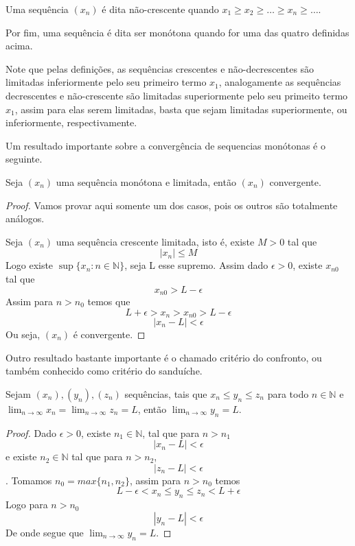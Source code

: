 Uma sequência $(x_n)$ é dita não-crescente quando $x_1 \geq x_2 \geq \dots 
\geq x_n \geq \dots$.

Por fim, uma sequência é dita ser monótona quando for uma das quatro definidas 
acima.

Note que pelas definições, as sequências crescentes e não-decrescentes são 
limitadas inferiormente pelo seu primeiro termo $x_1$, analogamente as sequências
decrescentes e não-crescente são limitadas superiormente pelo seu primeito termo 
$x_1$, assim para elas serem limitadas, basta que sejam limitadas superiormente,
ou inferiormente, respectivamente.

Um resultado importante sobre a convergência de sequencias monótonas é o seguinte.

\begin{teo}\label{monótona}
    Seja $(x_n)$ uma sequência monótona e limitada, então $(x_n)$ convergente.
\end{teo}

\begin{proof}
    Vamos provar aqui somente um dos casos, pois os outros são totalmente análogos.

    Seja $(x_n)$ uma sequência crescente limitada, isto é, existe $M>0$ tal que
    $$|x_n| \leq M $$ 
    Logo existe $\sup\{x_n: n \in \mathbb{N}\}$, seja L esse supremo.
    Assim dado $\epsilon > 0$, existe $x_{n0}$ tal que
    $$ x_{n0} > L - \epsilon $$
    Assim para $n>n_0$ temos que
    $$L + \epsilon > x_n > x_{n0} > L - \epsilon$$
    $$|x_n - L| < \epsilon $$
    Ou seja, $(x_n)$ é convergente.
\end{proof}

Outro resultado bastante importante é o chamado critério do confronto, ou também 
conhecido como critério do sanduíche.

\begin{teo}
    Sejam $(x_n),(y_n),(z_n)$ sequências, tais que $x_n \leq y_n \leq z_n$ para todo 
    $n \in \mathbb{N}$ e $\lim_{n \to \infty} x_n = \lim_{n \to \infty} z_n = L$,
    então $\lim_{n \to \infty} y_n = L$.
\end{teo}

\begin{proof}
    Dado $\epsilon > 0$, existe $n_1 \in \mathbb{N}$, tal que para $n>n_1$
    $$|x_n - L| < \epsilon$$
    e existe $n_2 \in \mathbb{N}$ tal que para $n>n_2$,
    $$|z_n - L| < \epsilon$$.
    Tomamos $n_0 = max\{n_1,n_2\}$, assim para $n > n_0$ temos
    $$L - \epsilon < x_n \leq y_n \leq z_n < L + \epsilon$$
    Logo para $n > n_0$
    $$ |y_n - L| < \epsilon$$
    De onde segue que $\lim_{n \to \infty} y_n = L$.
\end{proof}

